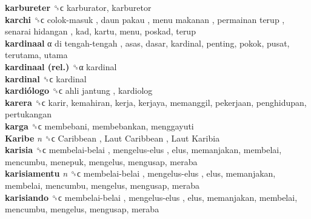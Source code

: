 \textbf{karbureter} ␝ϲ  karburator, karburetor  \\
\textbf{karchi} ␝ϲ   colok-masuk ,  daun pakau ,  menu makanan ,  permainan terup ,  senarai hidangan , kad, kartu, menu, poskad, terup  \\
\textbf{kardinaal} α   di tengah-tengah , asas, dasar, kardinal, penting, pokok, pusat, terutama, utama  \\
\textbf{kardinaal (rel.)} ␝α  kardinal  \\
\textbf{kardinal} ␝ϲ  kardinal  \\
\textbf{kardiólogo} ␝ϲ   ahli jantung , kardiolog  \\
\textbf{karera} ␝ϲ  karir, kemahiran, kerja, kerjaya, memanggil, pekerjaan, penghidupan, pertukangan  \\
\textbf{karga} ␝ϲ  membebani, membebankan, menggayuti  \\
\textbf{Karibe} \emph{n}  ␝ϲ   Caribbean ,  Laut Caribbean ,  Laut Karibia   \\
\textbf{karisia} ␝ϲ   membelai-belai ,  mengelus-elus , elus, memanjakan, membelai, mencumbu, menepuk, mengelus, mengusap, meraba  \\
\textbf{karisiamentu} \emph{n}  ␝ϲ   membelai-belai ,  mengelus-elus , elus, memanjakan, membelai, mencumbu, mengelus, mengusap, meraba  \\
\textbf{karisiando} ␝ϲ   membelai-belai ,  mengelus-elus , elus, memanjakan, membelai, mencumbu, mengelus, mengusap, meraba  \\

